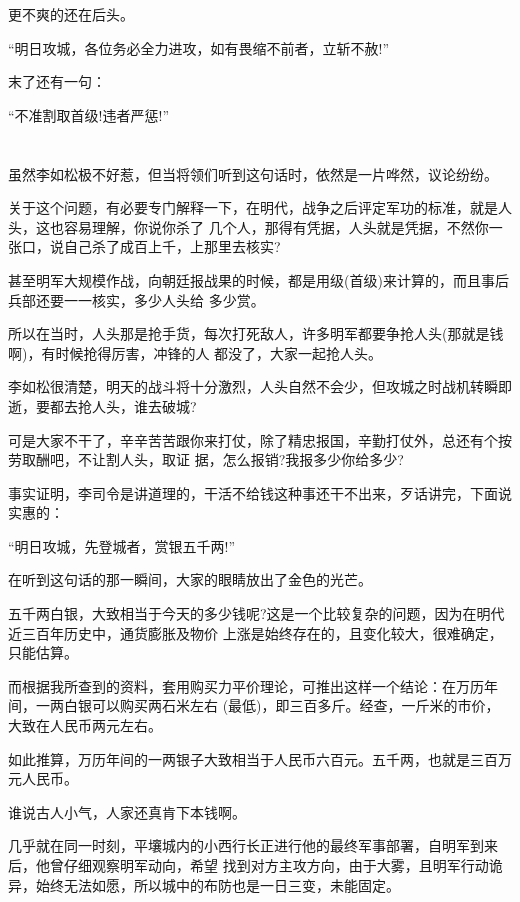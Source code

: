 \documentclass[11pt,a4paper,onecolumn]{article}
\begin{document}
更不爽的还在后头。

``明日攻城，各位务必全力进攻，如有畏缩不前者，立斩不赦!''

末了还有一句：

``不准割取首级!违者严惩!''

\section[\thesection]{}

虽然李如松极不好惹，但当将领们听到这句话时，依然是一片哗然，议论纷纷。

关于这个问题，有必要专门解释一下，在明代，战争之后评定军功的标准，就是人头，这也容易理解，你说你杀了
几个人，那得有凭据，人头就是凭据，不然你一张口，说自己杀了成百上千，上那里去核实?

甚至明军大规模作战，向朝廷报战果的时候，都是用级(首级)来计算的，而且事后兵部还要一一核实，多少人头给
多少赏。

所以在当时，人头那是抢手货，每次打死敌人，许多明军都要争抢人头(那就是钱啊)，有时候抢得厉害，冲锋的人
都没了，大家一起抢人头。

李如松很清楚，明天的战斗将十分激烈，人头自然不会少，但攻城之时战机转瞬即逝，要都去抢人头，谁去破城?

可是大家不干了，辛辛苦苦跟你来打仗，除了精忠报国，辛勤打仗外，总还有个按劳取酬吧，不让割人头，取证
据，怎么报销?我报多少你给多少?

事实证明，李司令是讲道理的，干活不给钱这种事还干不出来，歹话讲完，下面说实惠的：

``明日攻城，先登城者，赏银五千两!''

在听到这句话的那一瞬间，大家的眼睛放出了金色的光芒。

五千两白银，大致相当于今天的多少钱呢?这是一个比较复杂的问题，因为在明代近三百年历史中，通货膨胀及物价
上涨是始终存在的，且变化较大，很难确定，只能估算。

而根据我所查到的资料，套用购买力平价理论，可推出这样一个结论：在万历年间，一两白银可以购买两石米左右
(最低)，即三百多斤。经查，一斤米的市价，大致在人民币两元左右。

如此推算，万历年间的一两银子大致相当于人民币六百元。五千两，也就是三百万元人民币。

谁说古人小气，人家还真肯下本钱啊。

几乎就在同一时刻，平壤城内的小西行长正进行他的最终军事部署，自明军到来后，他曾仔细观察明军动向，希望
找到对方主攻方向，由于大雾，且明军行动诡异，始终无法如愿，所以城中的布防也是一日三变，未能固定。
\end{document}
